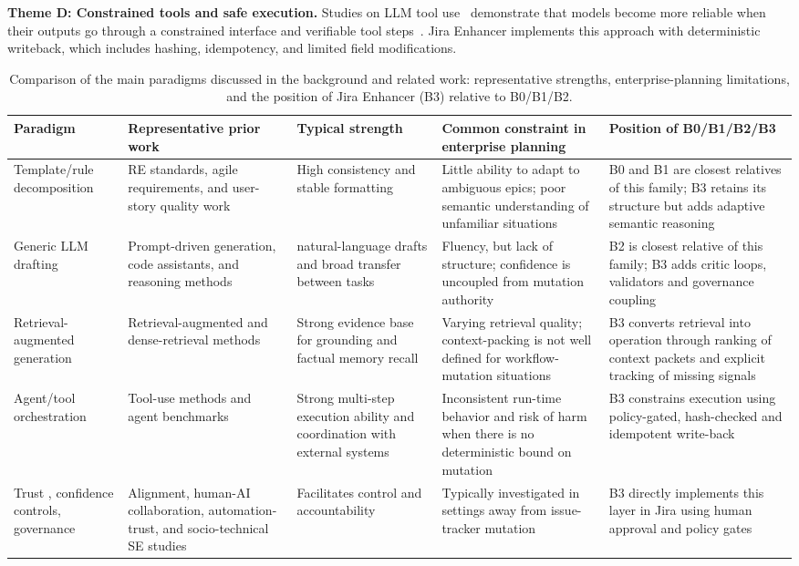 \documentclass[manuscript,review]{acmart}
\begin{document}
\textbf{Theme D: Constrained tools and safe execution.} Studies on LLM tool use~\cite{R16} demonstrate that models become more reliable when their outputs go through a constrained interface and verifiable tool steps~\cite{R91}. Jira Enhancer implements this approach with deterministic writeback, which includes hashing, idempotency, and limited field modifications.

\begin{table}[t]
\centering
\small
\caption{Comparison of the main paradigms discussed in the background and related work: representative strengths, enterprise-planning limitations, and the position of Jira Enhancer (B3) relative to B0/B1/B2.}
\label{tab:related-work-comparative}
\begin{tabularx}{\textwidth}{@{}>{\raggedright\arraybackslash}p{}>{\raggedright\arraybackslash}p{}>{\raggedright\arraybackslash}p{}>{\raggedright\arraybackslash}p{}>{\raggedright\arraybackslash}X@{}}
\toprule
Paradigm & Representative prior work & Typical strength & Common constraint in enterprise planning & Position of B0/B1/B2/B3 \\
\midrule
Template/rule decomposition & RE standards, agile requirements, and user-story quality work \cite{R52,R62,R63} & High consistency and stable formatting & Little ability to adapt to ambiguous epics; poor semantic understanding of unfamiliar situations & B0 and B1 are closest relatives of this family; B3 retains its structure but adds adaptive semantic reasoning \\
Generic LLM drafting & Prompt-driven generation, code assistants, and reasoning methods \cite{R1,R14,R59,R77} & natural-language drafts and broad transfer between tasks & Fluency, but lack of structure; confidence is uncoupled from mutation authority & B2 is closest relative of this family; B3 adds critic loops, validators and governance coupling \\
Retrieval-augmented generation & Retrieval-augmented and dense-retrieval methods \cite{R3,R5,R22} & Strong evidence base for grounding and factual memory recall & Varying retrieval quality; context-packing is not well defined for workflow-mutation situations & B3 converts retrieval into operation through ranking of context packets and explicit tracking of missing signals \\
Agent/tool orchestration & Tool-use methods and agent benchmarks \cite{R17,R27,R28,R92} & Strong multi-step execution ability and coordination with external systems & Inconsistent run-time behavior and risk of harm \cite{R87} when there is no deterministic bound on mutation & B3 constrains execution using policy-gated, hash-checked and idempotent write-back \\
Trust \cite{R76}, confidence controls, governance & Alignment, human-AI collaboration, automation-trust, and socio-technical SE studies \cite{R13,R57,R75,R58} & Facilitates control and accountability \cite{R56} & Typically investigated in settings away from issue-tracker mutation & B3 directly implements this layer in Jira using human approval and policy gates \\
\bottomrule
\end{tabularx}
\end{table}
\end{document}

